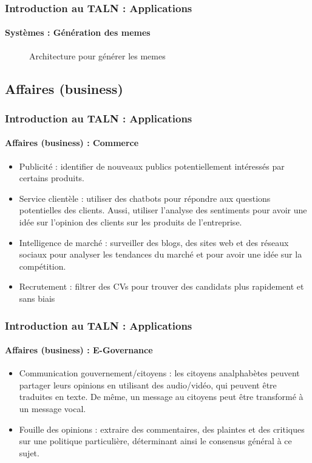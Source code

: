 \documentclass[xcolor=table]{beamer}
\begin{document}
\begin{frame}
\frametitle{Introduction au TALN : Applications}
\framesubtitle{Systèmes : Génération des memes}

\begin{figure}
	\centering
	\caption{Architecture pour générer les memes \cite{sadasivam2020memebot}}
\end{figure}

\end{frame}


\subsection{Affaires (business)}

\begin{frame}
\frametitle{Introduction au TALN : Applications}
\framesubtitle{Affaires (business) : Commerce}

\begin{itemize}
	\item Publicité : identifier de nouveaux publics potentiellement intéressés par certains produits.
	\item Service clientèle : utiliser des chatbots pour répondre aux questions potentielles des clients. Aussi, utiliser l'analyse des sentiments pour avoir une idée sur l'opinion des clients sur les produits de l'entreprise.
	\item Intelligence de marché : surveiller des blogs, des sites web et des réseaux sociaux pour analyser les tendances du marché et pour avoir une idée sur la compétition.
	\item Recrutement : filtrer des CVs pour trouver des candidats plus rapidement et sans biais
\end{itemize}

\end{frame}

\begin{frame}
\frametitle{Introduction au TALN : Applications}
\framesubtitle{Affaires (business) : E-Governance}

\begin{itemize}
	\item Communication gouvernement/citoyens : les citoyens analphabètes peuvent partager leurs opinions en utilisant des audio/vidéo, qui peuvent être traduites en texte. De même, un message au citoyens peut être transformé à un message vocal.
	\item Fouille des opinions : extraire des commentaires, des plaintes et des critiques sur une politique particulière, déterminant ainsi le consensus général à ce sujet.
\end{itemize}

\end{frame}
\end{document}
